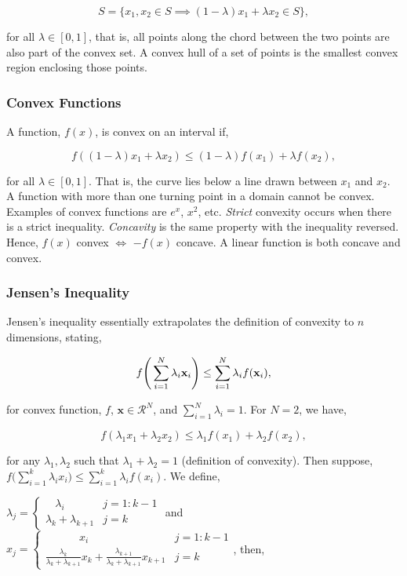 \documentclass[11pt]{amsart}
\begin{document}
$$S = \Big\{x_1, x_2 \in S \implies (1 - \lambda) x_1 + \lambda x_2 \in S \Big\},$$

for all $\lambda \in [0, 1]$, that is, all points along the chord between the two points are also part of the convex set. A convex hull of a set of points is the smallest convex region enclosing those points.

\subsubsection{Convex Functions}
A function, $f(x)$, is convex on an interval if,

$$
f((1 - \lambda)x_1 + \lambda x_2) \leq (1 - \lambda) f(x_1) + \lambda f(x_2),
$$

for all $\lambda \in [0, 1]$. That is, the curve lies below a line drawn between $x_1$ and $x_2$. A function with more than one turning point in a domain cannot be convex. Examples of convex functions are $e^x$, $x^2$, etc. \emph{Strict} convexity occurs when there is a strict inequality. \emph{Concavity} is the same property with the inequality reversed. Hence, $f(x)$ convex $\Longleftrightarrow$ $-f(x)$ concave. A linear function is both concave and convex.

\subsubsection{Jensen's Inequality}

Jensen's inequality essentially extrapolates the definition of convexity to $n$ dimensions, stating,

$$
f\Bigg(\sum_{i=1}^{N}\lambda_i \mathbf{x}_i\Bigg) \leq \sum_{i=1}^{N} \lambda_if(\mathbf{x}_i) \notag,
$$

for convex function, $f$, $\mathbf{x} \in \mathcal{R}^N$, and $\sum_{i=1}^N \lambda_i = 1$. For $N = 2$, we have,

$$
f(\lambda_1 x_1 + \lambda_2 x_2) \leq \lambda_1f(x_1) + \lambda_2f(x_2),
$$

for any $\lambda_1, \lambda_2$ such that $\lambda_1 + \lambda_2 = 1$ (definition of convexity). Then suppose, $f\big(\sum_{i=1}^k\lambda_i x_i\big) \leq \sum_{i=1}^k \lambda_if(x_i).$ We define,

$
\lambda_j = \begin{cases}
\ \ \ \ \lambda_i & j = 1: k-1 \\
\lambda_k + \lambda_{k+1} & j = k
\end{cases} $ and $
x_j = \begin{cases} 
\ \ \ \ \ \ \ \ \ \ \ \ \ \  x_i & j = 1: k-1 \\
\frac{\lambda_k}{\lambda_k + \lambda_{k+1}}x_k + \frac{\lambda_{k+1}}{\lambda_k + \lambda_{k+1}}x_{k+1} & j = k
\end{cases}$, then,
\end{document}
